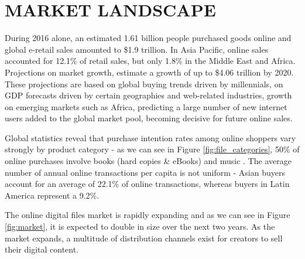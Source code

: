 
\section{MARKET LANDSCAPE} \label{landscape}
During 2016 alone, an estimated 1.61 billion people purchased goods online and global e-retail sales amounted to \$1.9 trillion. In Asia Pacific, online sales accounted for 12.1\% of retail sales, but only 1.8\% in the Middle East and Africa. Projections on market growth, estimate a growth of up to \$4.06 trillion by 2020. These projections are based on global buying trends driven by millennials, on  GDP forecasts  driven by certain geographies and web-related industries, growth on emerging markets such as Africa, predicting a large number of new internet users added to the global market pool, becoming decisive for future online sales.
 
Global statistics reveal that purchase intention rates among online shoppers vary strongly by product category - as we can see in Figure \ref{fig:file_categories}, 50\% of online purchases involve books (hard copies \& eBooks) and music . The average number of annual online transactions per capita is not uniform - Asian buyers account for an average of 22.1\% of online transactions, whereas buyers in Latin America represent a 9.2\%. 

The online digital files market is rapidly expanding and as we can see in Figure \ref{fig:market}, it is expected to double in size over the next two years. As the market expands, a multitude of distribution channels exist for creators to sell their digital content. 

